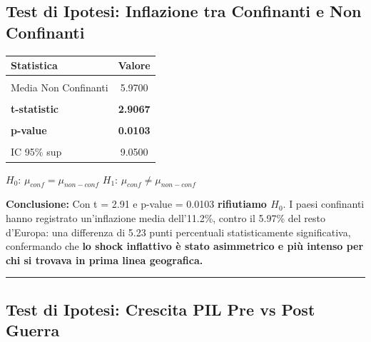 \documentclass[
  letterpaper,
  DIV=11,
  numbers=noendperiod]{scrartcl}
\begin{document}
\subsection{Test di Ipotesi: Inflazione tra Confinanti e Non
Confinanti}\label{test-di-ipotesi-inflazione-tra-confinanti-e-non-confinanti}

\begin{table}[!h]
\centering\begingroup\fontsize{8}{10}\selectfont

\begin{tabular}{lc}
\toprule
Statistica & Valore\\
\midrule
\cellcolor{gray!10}{Media Confinanti} & \cellcolor{gray!10}{11.2000}\\
Media Non Confinanti & 5.9700\\
\cellcolor{gray!10}{Differenza} & \cellcolor{gray!10}{5.2300}\\
\textbf{t-statistic} & \textbf{2.9067}\\
\textbf{\cellcolor{gray!10}{Gradi libertà}} & \textbf{\cellcolor{gray!10}{16.1000}}\\
\addlinespace
\textbf{p-value} & \textbf{0.0103}\\
\cellcolor{gray!10}{IC 95\% inf} & \cellcolor{gray!10}{1.4200}\\
IC 95\% sup & 9.0500\\
\bottomrule
\end{tabular}
\endgroup{}
\end{table}

\begin{center}
$H_0$: $\mu_{conf} = \mu_{non-conf}$ \quad $H_1$: $\mu_{conf} \neq \mu_{non-conf}$
\end{center}

\vspace{0.2cm}
\scriptsize

\textbf{Conclusione:} Con t = 2.91 e p-value = 0.0103
\textbf{rifiutiamo $H_0$}. I paesi confinanti hanno registrato
un'inflazione media dell'11.2\%, contro il 5.97\% del resto d'Europa:
una differenza di 5.23 punti percentuali statisticamente significativa,
confermando che
\textcolor{beamer@main}{\textbf{lo shock inflattivo è stato asimmetrico e più intenso per chi si trovava in prima linea geografica.}}

\begin{center}\rule{0.5\linewidth}{0.5pt}\end{center}

\subsection{Test di Ipotesi: Crescita PIL Pre vs Post
Guerra}\label{test-di-ipotesi-crescita-pil-pre-vs-post-guerra}
\end{document}
